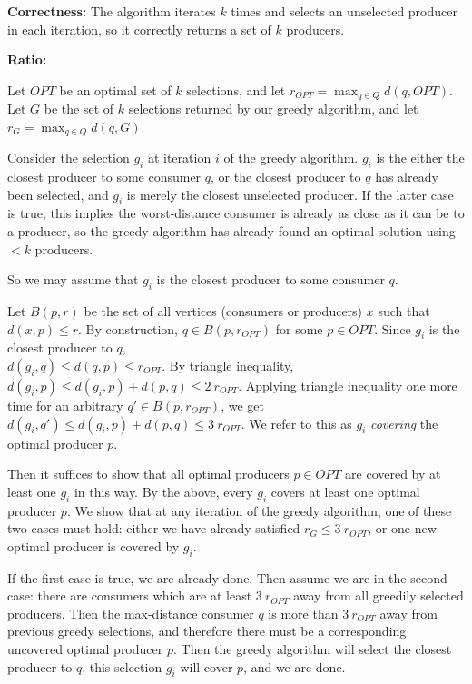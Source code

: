 \documentclass[letterpaper,12pt]{article}
\begin{document}
\textbf{Correctness:} The algorithm iterates $k$ times and selects an unselected
producer in each iteration, so it correctly returns a set of $k$ producers.

\pagebreak

\vspace{2mm}
\textbf{Ratio:}

Let $OPT$ be an optimal set of $k$ selections, and let $r_{OPT} = \max_{q \in Q}
d(q, OPT)$. Let $G$ be the set of $k$ selections returned by our greedy
algorithm, and let $r_G = \max_{q \in Q} d(q, G)$.

 Consider the selection $g_i$ at iteration $i$ of the greedy
algorithm. $g_i$ is the either the closest producer to some consumer $q$, or the
closest producer to $q$ has already been selected, and $g_i$ is merely the
closest unselected producer. If the latter case is true, this implies the
worst-distance consumer is already as close as it can be to a producer, so the
greedy algorithm has already found an optimal solution using $< k$ producers.

So we may assume that $g_i$ is the closest producer to some consumer $q$.

Let $B(p, r)$ be the set of all vertices (consumers or producers) $x$ such that
$d(x,p) \leq r$. By construction, $q \in B(p, r_{OPT})$ for some $p \in OPT$. Since
$g_i$ is the closest producer to $q$, \\$d(g_i, q) \leq d(q, p) \leq r_{OPT}$. By
triangle inequality, $d(g_i, p) \leq d(g_i, p) + d(p,q) \leq 2\ r_{OPT}$. Applying
triangle inequality one more time for an arbitrary $q' \in B(p, r_{OPT})$, we get
\\$d(g_i, q') \leq d(g_i, p) + d(p, q) \leq 3\ r_{OPT}$. We refer to this as $g_i$
\textit{covering} the optimal producer $p$.

Then it suffices to show that all optimal producers $p \in OPT$ are covered by at
least one $g_i$ in this way. By the above, every $g_i$ covers at least one
optimal producer $p$. We show that at any iteration of the greedy algorithm, one
of these two cases must hold: either we have already satisfied $r_G \leq 3\
r_{OPT}$, or one new optimal producer is covered by $g_i$.

If the first case is true, we are already done. Then assume we are in the second
case: there are consumers which are at least $3\ r_{OPT}$ away from all greedily
selected producers. Then the max-distance consumer $q$ is more than $3\ r_{OPT}$
away from previous greedy selections, and therefore there must be a
corresponding uncovered optimal producer $p$. Then the greedy algorithm will
select the closest producer to $q$, this selection $g_i$ will cover $p$, and we
are done.
\end{document}

